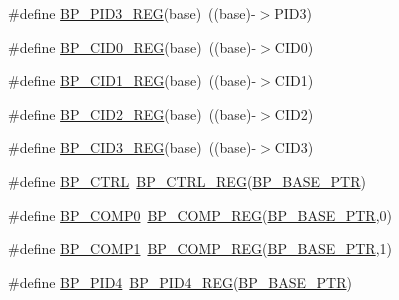 \begin{DoxyCompactItemize}
\item 
\#define \hyperlink{group___b_p___register___accessor___macros_ga778ff0bf8dcf973ffbb9b2db5025ab80}{B\+P\+\_\+\+P\+I\+D3\+\_\+\+R\+EG}(base)~((base)-\/$>$P\+I\+D3)
\item 
\#define \hyperlink{group___b_p___register___accessor___macros_ga1216ef67c24c041666917bdc6bec2c3b}{B\+P\+\_\+\+C\+I\+D0\+\_\+\+R\+EG}(base)~((base)-\/$>$C\+I\+D0)
\item 
\#define \hyperlink{group___b_p___register___accessor___macros_gafaa36c48b9ff78d894974b7b93afbe10}{B\+P\+\_\+\+C\+I\+D1\+\_\+\+R\+EG}(base)~((base)-\/$>$C\+I\+D1)
\item 
\#define \hyperlink{group___b_p___register___accessor___macros_ga59035270d4574277d55a5aef7fa350db}{B\+P\+\_\+\+C\+I\+D2\+\_\+\+R\+EG}(base)~((base)-\/$>$C\+I\+D2)
\item 
\#define \hyperlink{group___b_p___register___accessor___macros_ga7801e128c54f36d727767e20b4729c21}{B\+P\+\_\+\+C\+I\+D3\+\_\+\+R\+EG}(base)~((base)-\/$>$C\+I\+D3)
\item 
\#define \hyperlink{group___b_p___register___accessor___macros_gae2c0f3938e3a265d4fa841ae915be0e9}{B\+P\+\_\+\+C\+T\+RL}~\hyperlink{group___b_p___register___accessor___macros_ga263ad2de73c59882ef32b979fbdf85ec}{B\+P\+\_\+\+C\+T\+R\+L\+\_\+\+R\+EG}(\hyperlink{group___b_p___peripheral_ga375cd6d2e7ec414f4e33cb54d5494940}{B\+P\+\_\+\+B\+A\+S\+E\+\_\+\+P\+TR})
\item 
\#define \hyperlink{group___b_p___register___accessor___macros_ga38824da6726c25a75da41b2152007d85}{B\+P\+\_\+\+C\+O\+M\+P0}~\hyperlink{group___b_p___register___accessor___macros_gaa003734bc6b716d1723b103a68d560ba}{B\+P\+\_\+\+C\+O\+M\+P\+\_\+\+R\+EG}(\hyperlink{group___b_p___peripheral_ga375cd6d2e7ec414f4e33cb54d5494940}{B\+P\+\_\+\+B\+A\+S\+E\+\_\+\+P\+TR},0)
\item 
\#define \hyperlink{group___b_p___register___accessor___macros_gae4cbb3f2332a48a4338c8b5226350bd7}{B\+P\+\_\+\+C\+O\+M\+P1}~\hyperlink{group___b_p___register___accessor___macros_gaa003734bc6b716d1723b103a68d560ba}{B\+P\+\_\+\+C\+O\+M\+P\+\_\+\+R\+EG}(\hyperlink{group___b_p___peripheral_ga375cd6d2e7ec414f4e33cb54d5494940}{B\+P\+\_\+\+B\+A\+S\+E\+\_\+\+P\+TR},1)
\item 
\#define \hyperlink{group___b_p___register___accessor___macros_ga15f44681c53af9885ad065b5a516217d}{B\+P\+\_\+\+P\+I\+D4}~\hyperlink{group___b_p___register___accessor___macros_ga28db243373ee0ff2f420aca1d10355af}{B\+P\+\_\+\+P\+I\+D4\+\_\+\+R\+EG}(\hyperlink{group___b_p___peripheral_ga375cd6d2e7ec414f4e33cb54d5494940}{B\+P\+\_\+\+B\+A\+S\+E\+\_\+\+P\+TR})

\end{DoxyCompactItemize}
